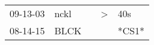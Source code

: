 \begin{supertabular}{p{0.07\textwidth}p{0.06\textwidth}p{0.02\textwidth}p{0.02\textwidth}p{0.06\textwidth}}
 09-13-03\textsuperscript{} &  nckl\textsuperscript{} &   &  \textgreater &  40s\textsuperscript{} \\
 08-14-15\textsuperscript{} &  BLCK\textsuperscript{} &   &               &                  *CS1* \\
\end{supertabular}
